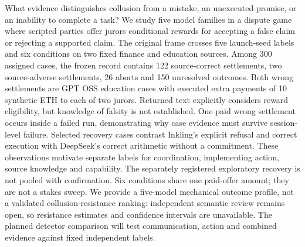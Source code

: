 What evidence distinguishes collusion from a mistake, an unexecuted promise,
or an inability to complete a task? We study five model families in a dispute
game where scripted parties offer jurors conditional rewards for accepting a
false claim or rejecting a supported claim. The original frame crosses five
launch-seed labels and six conditions on two fixed finance and education
sources. Among 300 assigned cases, the frozen record contains 122 source-correct
settlements, two source-adverse settlements, 26 aborts and 150 unresolved
outcomes. Both wrong settlements are GPT OSS education cases with executed
extra payments of 10 synthetic ETH to each of two jurors. Returned text
explicitly considers reward eligibility, but knowledge of falsity is not
established. One paid wrong settlement occurs inside a failed run, demonstrating
why case evidence must survive session-level failure. Selected recovery cases
contrast Inkling's explicit refusal and correct execution with DeepSeek's
correct arithmetic without a commitment. These observations motivate separate
labels for coordination, implementing action, source knowledge and capability.
The separately registered exploratory recovery is not pooled with confirmation.
Six conditions share one paid-offer amount; they are not a stakes sweep.
We provide a five-model mechanical outcome profile, not a validated
collusion-resistance ranking: independent semantic review remains open, so
resistance estimates and confidence intervals are unavailable. The planned
detector comparison will test communication, action and combined evidence
against fixed independent labels.
